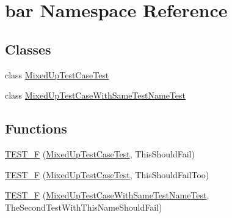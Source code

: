 \hypertarget{namespacebar}{\section{bar Namespace Reference}
\label{namespacebar}
}
\subsection*{Classes}
\begin{DoxyCompactItemize}
\item 
class \hyperlink{classbar_1_1_mixed_up_test_case_test}{Mixed\-Up\-Test\-Case\-Test}
\item 
class \hyperlink{classbar_1_1_mixed_up_test_case_with_same_test_name_test}{Mixed\-Up\-Test\-Case\-With\-Same\-Test\-Name\-Test}
\end{DoxyCompactItemize}
\subsection*{Functions}
\begin{DoxyCompactItemize}
\item 
\hyperlink{namespacebar_a0e342ef00f400f593f866279689c55ac}{T\-E\-S\-T\-\_\-\-F} (\hyperlink{classbar_1_1_mixed_up_test_case_test}{Mixed\-Up\-Test\-Case\-Test}, This\-Should\-Fail)
\item 
\hyperlink{namespacebar_adf88eb6e7ed65a5bd641aa80b237ea2c}{T\-E\-S\-T\-\_\-\-F} (\hyperlink{classbar_1_1_mixed_up_test_case_test}{Mixed\-Up\-Test\-Case\-Test}, This\-Should\-Fail\-Too)
\item 
\hyperlink{namespacebar_a600f9a0c34015b598089fb6b69adc63a}{T\-E\-S\-T\-\_\-\-F} (\hyperlink{classbar_1_1_mixed_up_test_case_with_same_test_name_test}{Mixed\-Up\-Test\-Case\-With\-Same\-Test\-Name\-Test}, The\-Second\-Test\-With\-This\-Name\-Should\-Fail)
\end{DoxyCompactItemize}


